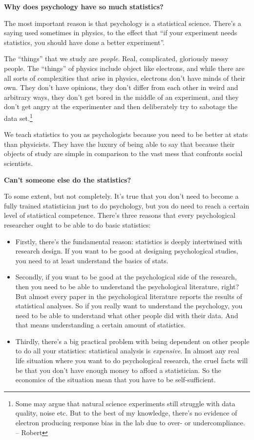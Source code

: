 \documentclass[
]{book}
\providecommand{\tightlist}{%
  \setlength{\itemsep}{0pt}\setlength{\parskip}{0pt}}
\theoremstyle{definition}
\theoremstyle{definition}
\theoremstyle{definition}
\theoremstyle{definition}
\theoremstyle{remark}
\begin{document}
\textbf{Why does psychology have so much statistics?}

The most important reason is that psychology is a statistical science. There's a saying used sometimes in physics, to the effect that ``if your experiment needs statistics, you should have done a better experiment''.

The ``things'' that we study are \emph{people}. Real, complicated, gloriously messy people. The ``things'' of physics include object like electrons, and while there are all sorts of complexities that arise in physics, electrons don't have minds of their own. They don't have opinions, they don't differ from each other in weird and arbitrary ways, they don't get bored in the middle of an experiment, and they don't get angry at the experimenter and then deliberately try to sabotage the data set.\footnote{Some may argue that natural science experiments still struggle with data quality, noise etc. But to the best of my knowledge, there's no evidence of electron producing response bias in the lab due to over- or undercompliance. -- Robert}

We teach statistics to you as psychologists because you need to be better at stats than physicists. They have the luxury of being able to say that because their objects of study are simple in comparison to the vast mess that confronts social scientists.

\textbf{Can't someone else do the statistics?}

To some extent, but not completely. It's true that you don't need to become a fully trained statistician just to do psychology, but you do need to reach a certain level of statistical competence. There's three reasons that every psychological researcher ought to be able to do basic statistics:

\begin{itemize}
\tightlist
\item
  Firstly, there's the fundamental reason: statistics is deeply intertwined with research design. If you want to be good at designing psychological studies, you need to at least understand the basics of stats.
\item
  Secondly, if you want to be good at the psychological side of the research, then you need to be able to understand the psychological literature, right? But almost every paper in the psychological literature reports the results of statistical analyses. So if you really want to understand the psychology, you need to be able to understand what other people did with their data. And that means understanding a certain amount of statistics.
\item
  Thirdly, there's a big practical problem with being dependent on other people to do all your statistics: statistical analysis is \emph{expensive}. In almost any real life situation where you want to do psychological research, the cruel facts will be that you don't have enough money to afford a statistician. So the economics of the situation mean that you have to be self-sufficient.
\end{itemize}
\end{document}

